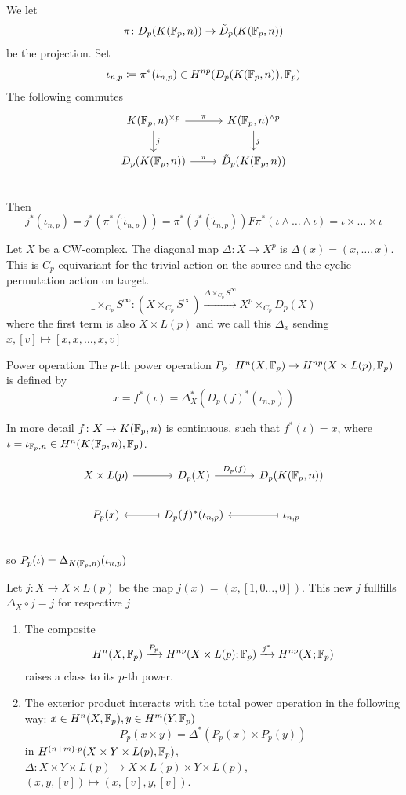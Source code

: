 \documentclass[language=english]{TemplateLecture}
\begin{document}
We let
\[\pi\colon D_p(K(\mathbb{F}_p, n)) \to \tilde D_p(K(\mathbb{F}_p, n))\]
be the projection. Set
\[\iota_{n,p} \coloneq \pi^*(\tilde \iota_{n,p}) \in H^{np}(D_p(K(\mathbb{F}_p, n)), \mathbb{F}_p)\]
The following commutes
\[\begin{tikzcd}
    K(\IF_p, n)^{\times p} \ar[d, "j"]\ar[r, "\pi"] & K(\IF_p, n)^{\wedge p} \ar[d, "j"] \\
    D_p(K(\IF_p, n)) \ar[r, "\pi"] &\tilde D_p(K(\IF_p, n)) \\
\end{tikzcd}\]
Then
\[j^*(\iota_{n,p}) = j^*(\pi^*(\tilde \iota_{n,p})) = \pi^*(j^*(\tilde\iota _{n,p})) F \pi^*(\iota\wedge \dots \wedge \iota) = \iota\times \dots \times \iota\]


Let \(X\) be a CW-complex. The diagonal map \(\Delta\colon X\to X^p\) is \(\Delta(x) = (x,\dots, x)\). This is \(C_p\)-equivariant for the trivial action on the source and the cyclic permutation action on target.
\[\_ \times_{C_p}S^\infty \colon (X\times_{C_p}S^\infty) \xrightarrow{\Delta\times_{C_p} S^\infty} X^p\times_{C_p} D_p(X)\]
where the first term is also \(X\times L(p)\) and we call this \(\Delta_x\) sending \(x, [v]\mapsto [x,x,\dots, x, v]\)

\begin{defi}{Power operation}{}
    The \(p\)-th power operation \(P_p\colon H^n(X,\mathbb{F}_p)\to H^{np}(X\times L(p), \mathbb{F}_p)\) is defined by
    \[x = f^*(\iota) = \Delta_X^*(D_p(f)^*(\iota_{n,p}))\]
\end{defi}

In more detail \(f\colon X\to K(\mathbb{F}_p, n)\) is continuous, such that \(f^*(\iota) = x\), where \(\iota = \iota_{\mathbb{F}_p,n}\in H^n(K(\mathbb{F}_p, n), \mathbb{F}_p)\).

\[\begin{tikzcd}
    X\times L(p) \ar[r] & D_p(X)\ar[r, "D_p(f)"]& D_p(K(\IF_p, n)) \\
    P_p(x) & D_p(f)^*(\iota_{n,p}) \ar[l, mapsto] & \iota_{n,p} \ar[l, mapsto] \\
\end{tikzcd}\]
so \(P_p(\iota) = \Delta_{K(\mathbb{F}_p, n)}(\iota_{n,p})\)

Let \(j\colon X \to X\times L(p)\) be the map \(j(x) = (x, [1, 0\dots, 0])\). This new \(j\) fullfills \(\Delta_X \circ j = j\) for respective \(j\)

\begin{proposition}
    \begin{enumerate}
        \item The composite
        \[H^n(X, \mathbb{F}_p) \xrightarrow{P_p} H^{np}(X\times L(p); \mathbb{F}_p) \xrightarrow{j^*} H^{np}(X; \mathbb{F}_p)\]
        raises a class to its \(p\)-th power.
        \item The exterior product interacts with the total power operation in the following way: \(x \in H^n(X, \mathbb{F}_p), y\in H^m(Y, \mathbb{F}_p)\)
        \[P_p(x\times y) =  \Delta^*(P_p(x)\times P_p(y))\]
        in \(H^{(n+m)\cdot p}(X\times Y\times L(p), \mathbb{F}_p)\), \(\Delta\colon X\times Y \times L(p) \to X\times L(p)\times Y \times L(p) \), \((x,y, [v]) \mapsto (x, [v], y, [v])\).
    \end{enumerate}
\end{proposition}
\end{document}
